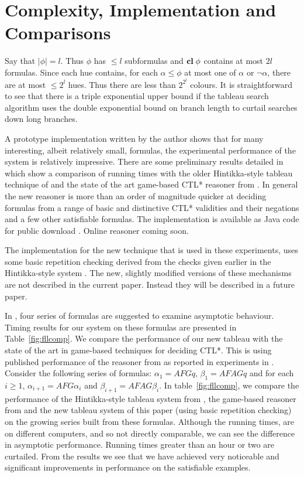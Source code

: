 \documentclass[submission,copyright,creativecommons]{eptcs}
\newcommand{\clos}{\mbox{{\bf cl}}\;}
\begin{document}
\section{Complexity, Implementation and Comparisons}
\label{sec:complex}

Say that $| \phi |=l$.
Thus $\phi$ has $\leq l$ subformulas
and $\clos \phi$ contains
at most $2l$ formulas.
Since each hue contains,
for each $\alpha \leq \phi$ at most
one of $\alpha$ or $\neg \alpha$,
there are at most
$\leq 2^l$ hues.
Thus there are
less than $2^{2^l}$ colours.
It is straightforward to see that there
is a triple exponential upper bound
if the tableau search algorithm
uses the double exponential bound on branch length
\cite{Rey:startab}
to curtail searches down long branches.

A prototype implementation written by the author
shows that for many interesting, albeit relatively small,
formulas, the experimental performance
of the system is relatively impressive.
There are some preliminary results 
detailed in
\cite{Rey:fasttablong}
which show a comparison of running times
with the older Hintikka-style tableau technique
of \cite{Rey:startab}
and the 
state of the art game-based CTL* reasoner from
 \cite{FLL10}.
 In general the new reasoner is more than an order
 of magnitude quicker at deciding
 formulas
 from a range of basic and distinctive
 CTL* validities and their negations
 and a few other satisfiable formulas.
 The implementation is available as Java code
 for public download \cite{Rey:fasttablong}.
 Online reasoner coming soon.

The implementation
for the new technique that is used in these experiments,
uses some basic repetition checking
derived from the
checks given earlier in the Hintikka-style system \cite{Rey:startab}.
The new, slightly modified
versions of these mechanisms are not described in the current paper.
Instead they will be described in a future paper.

In \cite{FLL10},
four series of formulas are suggested to 
examine asymptotic behaviour.
Timing results for our system 
on these formulas are
presented in Table~\ref{fig:fllcomp}.
We compare
the performance of our new tableau with
the state of the art in game-based
techniques for deciding CTL*.
This is using published performance
of the reasoner from \cite{FLL10}
as reported in experiments 
in \cite{DBLP:journals/entcs/McCabe-Dansted11}.
Consider the following series of formulas:
$\alpha_1=AFGq$,
$\beta_1=AFAGq$
and for each $i \geq 1$,
$\alpha_{i+1}=AFG\alpha_i$
and
$\beta_{i+1}=AFAG \beta_i$.
In table~\ref{fig:fllcomp},
we compare the performance of the 
Hintikka-style tableau system from
\cite{Rey:startab},
the game-based reasoner
from \cite{FLL10} and
the new tableau system of this paper
(using basic repetition checking)
on the growing series built from these formulas.
Although the running times, are on different computers,
and so not directly comparable,
we can see the difference in asymptotic performance.
Running times greater than an hour or two are curtailed.
From the results we see that
we have achieved 
very noticeable and significant improvements
in performance
on the satisfiable examples.
\end{document}
